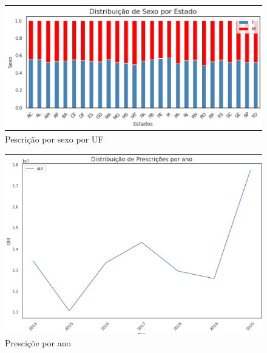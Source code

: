 \documentclass[10pt,brazil]{beamer}
\theoremstyle{definition}
\begin{document}
\begin{frame}[plain]
  \hspace*{-10mm}
    \begin{figure}
    \centering  
  \includegraphics[width=.6\paperwidth]{distribuicao_sexo.png}
      \caption{Pescrição por sexo por UF}
  \end{figure}  
\end{frame}

\begin{frame}[plain]
  \hspace*{-10mm}
    \begin{figure}
    \centering  
  \includegraphics[width=.6\paperwidth]{distribuicao_presc_ano.png}
      \caption{Presciçõe por ano}
  \end{figure}  
\end{frame}
\end{document}
